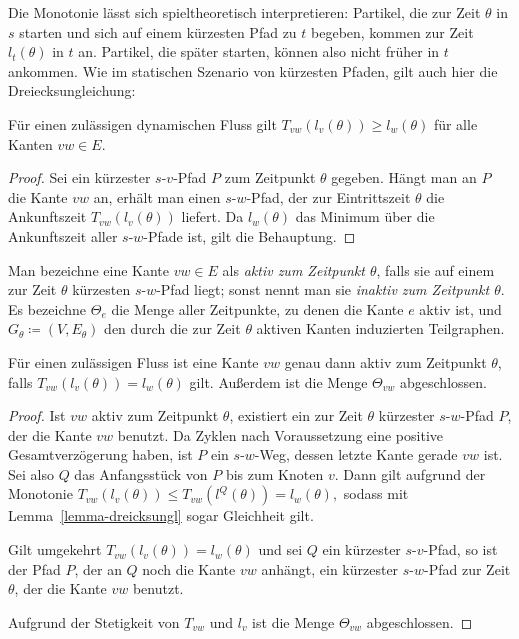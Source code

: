 Die Monotonie lässt sich spieltheoretisch interpretieren:
Partikel, die zur Zeit $\theta$ in $s$ starten und sich auf einem kürzesten Pfad zu $t$ begeben, kommen zur Zeit $l_t(\theta)$ in $t$ an.
Partikel, die später starten, können also nicht früher in $t$ ankommen.
Wie im statischen Szenario von kürzesten Pfaden, gilt auch hier die Dreiecksungleichung: 

\begin{lemma}\label{lemma-dreicksungl}
	Für einen zulässigen dynamischen Fluss gilt 
	$T_{vw}(l_v(\theta)) \geq l_w(\theta)$ für alle Kanten $vw\in E$.
\end{lemma}
\begin{proof}
	Sei ein kürzester $s$-$v$-Pfad $P$ zum Zeitpunkt $\theta$ gegeben.
	Hängt man an $P$ die Kante $vw$ an, erhält man einen $s$-$w$-Pfad, der zur Eintrittszeit $\theta$ die Ankunftszeit $T_{vw}(l_v(\theta))$ liefert.
	Da $l_w(\theta)$ das Minimum über die Ankunftszeit aller $s$-$w$-Pfade ist, gilt die Behauptung.
\end{proof}

\begin{definition}
	Man bezeichne eine Kante $vw\in E$ als \emph{aktiv zum Zeitpunkt $\theta$}, falls sie auf einem zur Zeit $\theta$ kürzesten $s$-$w$-Pfad liegt; sonst nennt man sie \emph{inaktiv zum Zeitpunkt $\theta$}.
	Es bezeichne $\Theta_e$ die Menge aller Zeitpunkte, zu denen die Kante $e$ aktiv ist, und $G_\theta \coloneq (V, E_\theta)$ den durch die zur Zeit $\theta$ aktiven Kanten induzierten Teilgraphen.
\end{definition}

\begin{proposition}
	Für einen zulässigen Fluss ist eine Kante $vw$ genau dann aktiv zum Zeitpunkt $\theta$, falls $T_{vw}(l_v(\theta)) = l_w(\theta)$ gilt.
	Außerdem ist die Menge $\Theta_{vw}$ abgeschlossen.
\end{proposition}
\begin{proof}
	Ist $vw$ aktiv zum Zeitpunkt $\theta$, existiert ein zur Zeit $\theta$ kürzester $s$-$w$-Pfad $P$, der die Kante $vw$ benutzt.
	Da Zyklen nach Voraussetzung eine positive Gesamtverzögerung haben, ist $P$ ein $s$-$w$-Weg, dessen letzte Kante gerade $vw$ ist.
	Sei also $Q$ das Anfangsstück von $P$ bis zum Knoten $v$.
	Dann gilt aufgrund der Monotonie $
	T_{vw}(l_v(\theta)) \leq T_{vw}( l^Q(\theta) ) = l_w(\theta),
	$
	sodass mit Lemma~\ref{lemma-dreicksungl} sogar Gleichheit gilt.
	
	Gilt umgekehrt $T_{vw}(l_v(\theta)) = l_w(\theta)$ und sei $Q$ ein kürzester $s$-$v$-Pfad, so ist der Pfad $P$, der an $Q$ noch die Kante $vw$ anhängt, ein kürzester $s$-$w$-Pfad zur Zeit $\theta$, der die Kante $vw$ benutzt.
	
	Aufgrund der Stetigkeit von $T_{vw}$ und $l_v$ ist die Menge $\Theta_{vw}$ abgeschlossen.
\end{proof}


